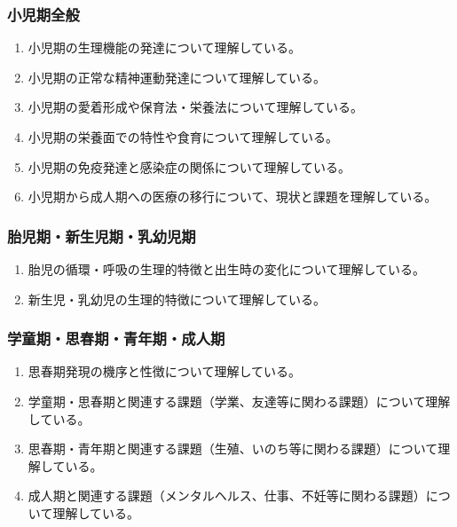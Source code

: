 \hypertarget{ux5c0fux5150ux671fux5168ux822c}{%
\subsubsection{小児期全般}\label{ux5c0fux5150ux671fux5168ux822c}}

\begin{enumerate}
\def\labelenumi{\arabic{enumi}.}
\tightlist
\item
  小児期の生理機能の発達について理解している。
\item
  小児期の正常な精神運動発達について理解している。
\item
  小児期の愛着形成や保育法・栄養法について理解している。
\item
  小児期の栄養面での特性や食育について理解している。
\item
  小児期の免疫発達と感染症の関係について理解している。
\item
  小児期から成人期への医療の移行について、現状と課題を理解している。
\end{enumerate}

\hypertarget{ux80ceux5150ux671fux65b0ux751fux5150ux671fux4e73ux5e7cux5150ux671f}{%
\subsubsection{胎児期・新生児期・乳幼児期}\label{ux80ceux5150ux671fux65b0ux751fux5150ux671fux4e73ux5e7cux5150ux671f}}

\begin{enumerate}
\def\labelenumi{\arabic{enumi}.}
\tightlist
\item
  胎児の循環・呼吸の生理的特徴と出生時の変化について理解している。
\item
  新生児・乳幼児の生理的特徴について理解している。
\end{enumerate}

\hypertarget{ux5b66ux7ae5ux671fux601dux6625ux671fux9752ux5e74ux671fux6210ux4ebaux671f}{%
\subsubsection{学童期・思春期・青年期・成人期}\label{ux5b66ux7ae5ux671fux601dux6625ux671fux9752ux5e74ux671fux6210ux4ebaux671f}}

\begin{enumerate}
\def\labelenumi{\arabic{enumi}.}
\tightlist
\item
  思春期発現の機序と性徴について理解している。
\item
  学童期・思春期と関連する課題（学業、友達等に関わる課題）について理解している。
\item
  思春期・青年期と関連する課題（生殖、いのち等に関わる課題）について理解している。
\item
  成人期と関連する課題（メンタルヘルス、仕事、不妊等に関わる課題）について理解している。
\end{enumerate}

